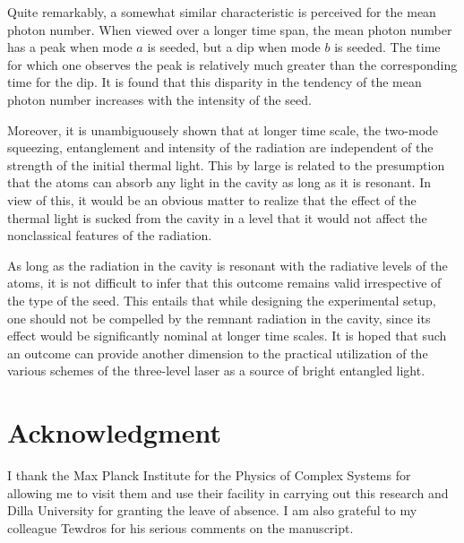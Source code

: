 \documentclass[twocolumn,showpacs,preprintnumbers,amsmath,amssymb,pra]{revtex4}
\begin{document}
Quite remarkably, a somewhat similar characteristic is perceived for the mean photon number. When viewed over a longer time span, the mean photon number has a peak when mode $a$ is seeded, but a dip when mode $b$ is seeded. The time for which one observes the peak is relatively much greater than the corresponding time for the dip. It is found that this disparity in the tendency of the mean photon number increases with the intensity of the seed.

Moreover, it is unambiguousely shown that at longer time scale, the two-mode squeezing, entanglement and intensity of the radiation are independent of the strength of the initial thermal light. This by large is related to  the presumption that the atoms can absorb any light in the cavity as long as it is resonant. In view of this, it would be an obvious matter to realize that the effect of the thermal light is sucked from the cavity in a level that it would not affect the nonclassical features of the radiation. 

As long as the radiation in the cavity is resonant with the radiative levels of the atoms, it is not difficult to infer that this outcome remains valid irrespective of the type of the seed. This  entails that while designing the experimental setup, one should not be compelled by the remnant radiation in the cavity, since its effect would be significantly nominal at longer time scales. It is hoped that such an outcome can provide another dimension to the practical utilization of the various schemes of the three-level laser as a source of bright entangled light.

\section*{Acknowledgment}

I thank the Max Planck Institute for the Physics of  Complex Systems for allowing me to visit them and use their facility in carrying out this research and Dilla University for granting the leave of absence. I am also grateful to my colleague Tewdros for his serious comments on the manuscript. 


\end{document}

